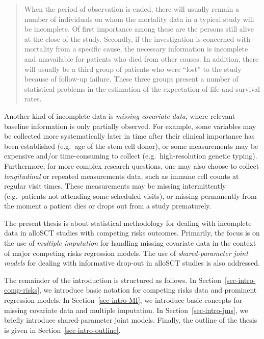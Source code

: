 \documentclass[
  letterpaper,
  DIV=11,
  numbers=noendperiod]{scrreprt}
\begin{document}
\begin{quote}
When the period of observation is ended, there will usually remain a
number of individuals on whom the mortality data in a typical study will
be incomplete. Of first importance among these are the persons still
alive at the close of the study. Secondly, if the investigation is
concerned with mortality from a specific cause, the necessary
information is incomplete and unavailable for patients who died from
other causes. In addition, there will usually be a third group of
patients who were ``lost'' to the study because of follow-up failure.
These three groups present a number of statistical problems in the
estimation of the expectation of life and survival rates.
\end{quote}

Another kind of incomplete data is \emph{missing covariate data}, where
relevant baseline information is only partially observed. For example,
some variables may be collected more systematically later in time after
their clinical importance has been established (e.g.~age of the stem
cell donor), or some measurements may be expensive and/or time-consuming
to collect (e.g.~high-resolution genetic typing). Furthermore, for more
complex research questions, one may also choose to collect
\emph{longitudinal} or repeated measurements data, such as immune cell
counts at regular visit times. These measurements may be missing
intermittently (e.g.~patients not attending some scheduled visits), or
missing permanently from the moment a patient dies or drops out from a
study prematurely.

The present thesis is about statistical methodology for dealing with
incomplete data in alloSCT studies with competing risks outcomes.
Primarily, the focus is on the use of \emph{multiple imputation} for
handling missing covariate data in the context of major competing risks
regression models. The use of \emph{shared-parameter joint models} for
dealing with informative drop-out in alloSCT studies is also addressed.

The remainder of the introduction is structured as follows. In
Section~\ref{sec-intro-comp-risks}, we introduce basic notation for
competing risks data and prominent regression models. In
Section~\ref{sec-intro-MI}, we introduce basic concepts for missing
covariate data and multiple imputation. In Section~\ref{sec-intro-jms},
we briefly introduce shared-parameter joint models. Finally, the outline
of the thesis is given in Section~\ref{sec-intro-outline}.
\end{document}
